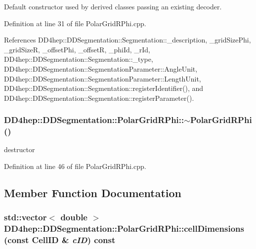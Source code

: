 Default constructor used by derived classes passing an existing decoder. 

Definition at line 31 of file PolarGridRPhi.cpp.

References DD4hep::DDSegmentation::Segmentation::\_\-description, \_\-gridSizePhi, \_\-gridSizeR, \_\-offsetPhi, \_\-offsetR, \_\-phiId, \_\-rId, DD4hep::DDSegmentation::Segmentation::\_\-type, DD4hep::DDSegmentation::SegmentationParameter::AngleUnit, DD4hep::DDSegmentation::SegmentationParameter::LengthUnit, DD4hep::DDSegmentation::Segmentation::registerIdentifier(), and DD4hep::DDSegmentation::Segmentation::registerParameter().\hypertarget{class_d_d4hep_1_1_d_d_segmentation_1_1_polar_grid_r_phi_a6801dd3c1227633c1865d9f4acf3b7cb}{
\subsubsection[{$\sim$PolarGridRPhi}]{\setlength{\rightskip}{0pt plus 5cm}DD4hep::DDSegmentation::PolarGridRPhi::$\sim$PolarGridRPhi ()}}
\label{class_d_d4hep_1_1_d_d_segmentation_1_1_polar_grid_r_phi_a6801dd3c1227633c1865d9f4acf3b7cb}


destructor 

Definition at line 46 of file PolarGridRPhi.cpp.

\subsection{Member Function Documentation}
\hypertarget{class_d_d4hep_1_1_d_d_segmentation_1_1_polar_grid_r_phi_a4f443aab6b49eb7bb6a831fd9fd908ee}{
\subsubsection[{cellDimensions}]{\setlength{\rightskip}{0pt plus 5cm}std::vector$<$ double $>$ DD4hep::DDSegmentation::PolarGridRPhi::cellDimensions (const {\bf CellID} \& {\em cID}) const}}
\label{class_d_d4hep_1_1_d_d_segmentation_1_1_polar_grid_r_phi_a4f443aab6b49eb7bb6a831fd9fd908ee}


